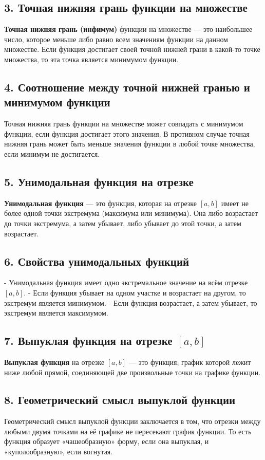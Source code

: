 \documentclass[a4paper,12pt]{article}
\begin{document}
\subsection*{3. Точная нижняя грань функции на множестве}
\textbf{Точная нижняя грань (инфимум)} функции на множестве — это наибольшее число, которое меньше либо равно всем значениям функции на данном множестве. Если функция достигает своей точной нижней грани в какой-то точке множества, то эта точка является минимумом функции.

\subsection*{4. Соотношение между точной нижней гранью и минимумом функции}
Точная нижняя грань функции на множестве может совпадать с минимумом функции, если функция достигает этого значения. В противном случае точная нижняя грань может быть меньше значения функции в любой точке множества, если минимум не достигается.

\subsection*{5. Унимодальная функция на отрезке}
\textbf{Унимодальная функция} — это функция, которая на отрезке \( [a, b] \) имеет не более одной точки экстремума (максимума или минимума). Она либо возрастает до точки экстремума, а затем убывает, либо убывает до этой точки, а затем возрастает.

\subsection*{6. Свойства унимодальных функций}
- Унимодальная функция имеет одно экстремальное значение на всём отрезке \( [a, b] \).
- Если функция убывает на одном участке и возрастает на другом, то экстремум является минимумом.
- Если функция возрастает, а затем убывает, то экстремум является максимумом.

\subsection*{7. Выпуклая функция на отрезке \( [a, b] \)}
\textbf{Выпуклая функция} на отрезке \( [a, b] \) — это функция, график которой лежит ниже любой прямой, соединяющей две произвольные точки на графике функции.

\subsection*{8. Геометрический смысл выпуклой функции}
Геометрический смысл выпуклой функции заключается в том, что отрезки между любыми двумя точками на её графике не пересекают график функции. То есть функция образует «чашеобразную» форму, если она выпуклая, и «куполообразную», если вогнутая.
\end{document}

